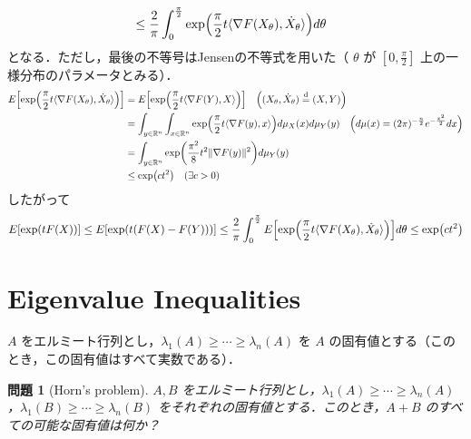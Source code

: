 \documentclass{ltjsarticle}
\makeatletter
\theoremstyle{mystyle1}
\theoremstyle{mystyle2}
\newtheorem{qes}{問題}
\theoremstyle{mystyle3}
\renewenvironment{proof}[1][\proofname]{\par
  \pushQED{\qed}%
  \normalfont
  \topsep6\p@\@plus6\p@ \trivlist
  \item[\hskip\labelsep{\bfseries\sffamily #1}]\ignorespaces
}{%
  \popQED\endtrivlist\@endpefalse
}
\renewcommand\proofname{証明}
\makeatother
\begin{document}
\begin{proof}
\begin{equation}
\begin{split}
            & \leq\frac{2}{\pi}\int_0^{\frac{\pi}{2}}\exp\mleft(\frac{\pi}{2}t\langle\nabla F(X_\theta),\dot{X}_\theta\rangle\mright)d\theta
        \end{split}
    \end{equation}
    となる．ただし，最後の不等号はJensenの不等式を用いた（ $\theta$ が $[0,\frac{\pi}{2}]$ 上の一様分布のパラメータとみる）．
    \begin{equation}
        \begin{split}
            E\mleft[\exp\mleft(\frac{\pi}{2}t\langle\nabla F(X_\theta),\dot{X}_\theta\rangle\mright)\mright]
            & = E\mleft[\exp\mleft(\frac{\pi}{2}t\langle\nabla F(Y),X\rangle\mright)\mright]\quad\mleft((X_\theta,\dot{X}_\theta)\overset{\mathrm{d}}{=}(X,Y)\mright)                                             \\
            & = \int_{y\in\mathbb{R}^n}\int_{x\in\mathbb{R}^n}\exp\mleft(\frac{\pi}{2}t\langle\nabla F(y),x\rangle\mright)d\mu_X(x)d\mu_Y(y)\quad\mleft(d\mu(x)=(2\pi)^{-\frac{n}{2}}e^{-\frac{x^2}{2}}dx\mright) \\
            & = \int_{y\in\mathbb{R}^n}\exp(\frac{\pi^2}{8}t^2\|\nabla F(y)\|^2)d\mu_Y(y)                                                                                                                         \\
            & \leq \exp(ct^2) \quad (\exists c>0)
        \end{split}
    \end{equation}
    したがって
    \begin{equation}
        E[\exp(tF(X))]\leq E[\exp(t(F(X)-F(Y)))]\leq\frac{2}{\pi}\int_0^{\frac{\pi}{2}}E\mleft[\exp\mleft(\frac{\pi}{2}t\langle\nabla F(X_\theta),\dot{X}_\theta\rangle\mright)\mright]d\theta\leq\exp(ct^2)
    \end{equation}
\end{proof}

\section{Eigenvalue Inequalities}

$A$ をエルミート行列とし，$\lambda_1(A)\geq\cdots\geq\lambda_n(A)$ を $A$ の固有値とする（このとき，この固有値はすべて実数である）．

\begin{qes}[Horn's problem]
    $A,B$ をエルミート行列とし，$\lambda_1(A)\geq\cdots\geq\lambda_n(A)$，$\lambda_1(B)\geq\cdots\geq\lambda_n(B)$ をそれぞれの固有値とする．このとき，$A+B$ のすべての可能な固有値は何か？
\end{qes}
\end{document}

